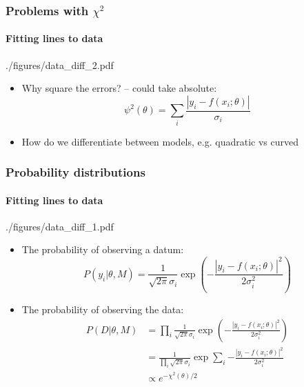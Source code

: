 \documentclass[%
]{beamer}
\begin{document}
\begin{frame}
    \frametitle{Problems with $\chi^2$}
    \framesubtitle{Fitting lines to data}
    \begin{figright}[0.4]{./figures/data_diff_2.pdf}
        \begin{itemize}
            \item Why square the errors? -- could take absolute:
                \[
                    \psi^2(\theta) = \sum_i \frac{\left|y_i - f(x_i;\theta)\right|}{\sigma_i}
                \]
            \item How do we differentiate between models, e.g. quadratic vs curved
        \end{itemize}
    \end{figright}
\end{frame}

\begin{frame}
    \frametitle{Probability distributions}
    \framesubtitle{Fitting lines to data}
    \begin{figright}[0.6]{./figures/data_diff_1.pdf}
        \begin{itemize}
            \item The probability of observing a datum:
                \[
                    P(y_i | \theta,M) = \frac{1}{\sqrt{2\pi}\sigma_i}\exp\left({-\frac{|y_i-f(x_i;\theta)|^2}{2\sigma_i^2}}\right)
                \]
            \item The probability of observing the data:
                \begin{align}
                    P(D | \theta,M) &= \prod_i \frac{1}{\sqrt{2\pi}\sigma_i}\exp\left({-\frac{|y_i-f(x_i;\theta)|^2}{2\sigma_i^2}}\right) \nonumber\\
                    &=  \frac{1}{\prod_i\sqrt{2\pi}\sigma_i}\exp\sum_i{-\frac{|y_i-f(x_i;\theta)|^2}{2\sigma_i^2}} \nonumber\\
                    &\propto e^{-\chi^2(\theta)/2}
                    \nonumber
                \end{align}
        \end{itemize}
    \end{figright}
\end{frame}
\end{document}

